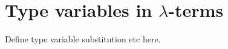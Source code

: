\documentclass[main.tex]{subfiles}
\begin{document}
\section{Type variables in $\lambda$-terms}
\label{lambda:typevars}

Define type variable substitution etc here.
\end{document}
